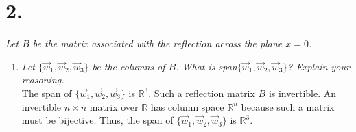 \documentclass[12pt]{article}
\begin{document}
\section*{2.}
\textit{Let $B$ be the matrix associated with the reflection across the plane
$x = 0$.}
\begin{enumerate}[label=(\alph*)]
	\item \textit{Let $\{\vec{w}_1, \vec{w}_2, \vec{w}_3\}$ be the columns of
	$B$. What is span$\{\vec{w}_1, \vec{w}_2, \vec{w}_3\}$? Explain your
	reasoning.} \\[\baselineskip]
	The span of $\{\vec{w}_1, \vec{w}_2, \vec{w}_3\}$ is $\mathbb{R}^3$.
	Such a reflection matrix $B$ is invertible. An invertible $n \times n$
	matrix over $\mathbb{R}$ has column space $\mathbb{R}^n$ because such a
	matrix must be bijective. Thus, the span of
	$\{\vec{w}_1, \vec{w}_2, \vec{w}_3\}$ is $\mathbb{R}^3$.
	

\end{enumerate}
\end{document}
